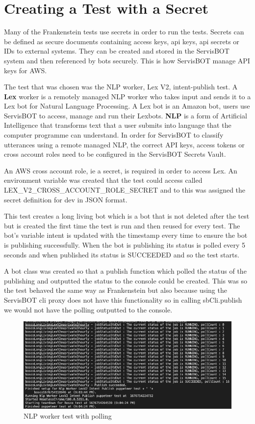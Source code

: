 \documentclass[12pt,a4paper,titlepage]{report}
\begin{document}
\section{Creating a Test with a Secret}
Many of the Frankenstein tests use secrets in order to run the tests. Secrets can be defined as secure documents containing access keys, api keys, api secrets or IDs to external systems. They can be created and stored in the ServisBOT system and then referenced by bots securely. This is how ServisBOT manage API keys for AWS.

The test that was chosen was the NLP worker, Lex V2, intent-publish test. A \textbf{Lex} worker is a remotely managed NLP worker who takes input and sends it to a Lex bot for Natural Language Processing. A Lex bot is an Amazon bot, users use ServisBOT to access, manage and run their Lexbots. 
\textbf{NLP} is a form of Artificial Intelligence that transforms text that a user submits into language that the computer programme can understand. In order for ServisBOT to classify utterances using a remote managed NLP, the correct API keys, access tokens or cross account roles need to be configured in the ServisBOT Secrets Vault.

An AWS cross account role, ie a secret, is required in order to access Lex. An environment variable was created that the test could access called LEX\_V2\_CROSS\_ACCOUNT\_ROLE\_SECRET and to this was assigned the secret definition for dev in JSON format. 

This test creates a long living bot which is a bot that is not deleted after the test but is created the first time the test is run and then reused for every test. The bot's variable intent is updated with the timestamp every time to ensure the bot is publishing successfully. When the bot is publishing its status is polled every 5 seconds and when published its status is SUCCEEDED and so the test starts.

A bot class was created so that a publish function which polled the status of the publishing and outputted the status to the console could be created. This was so 
the test behaved the same way as Frankenstein but also because using the ServisBOT cli proxy does not have this functionality so in calling sbCli.publish we would 
not have the polling outputted to the console.

\begin{figure}[ht]
 \centering
 \includegraphics[width=15cm]{./diagrams/nlp_worker_poll.png}
 \caption{NLP worker test with polling}
\end{figure}
\end{document}
